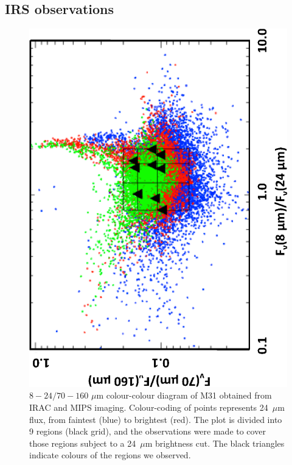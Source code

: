 \subsection{IRS observations}
\label{sect:irs_obs}

\begin{figure}
\centering
\includegraphics[width = 6.5 cm,angle=270]{fig1.eps}
\caption{$8 - 24/70 - 160$ $\mu$m colour-colour diagram of M31 obtained from IRAC and MIPS imaging. Colour-coding of points represents
24~$\mu$m flux, from faintest (blue) to brightest (red). The plot is divided into 9 regions (black grid), and the observations were made to 
cover those regions subject to a 24~$\mu$m brightness cut. The black triangles indicate colours of the regions we observed.}
\label{colourmaps}
\end{figure}

